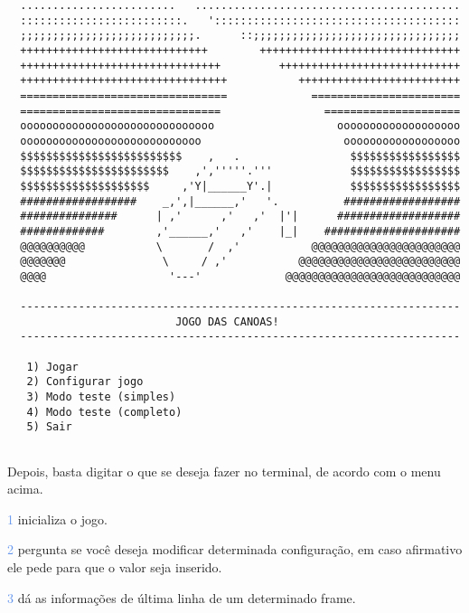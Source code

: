 \documentclass[a4paper,12pt]{article}
\begin{document}
  \begin{verbatim}
  ........................   .........................................
  :::::::::::::::::::::::::.   '::::::::::::::::::::::::::::::::::::::
  ;;;;;;;;;;;;;;;;;;;;;;;;;;;.      ::;;;;;;;;;;;;;;;;;;;;;;;;;;;;;;;;
  +++++++++++++++++++++++++++++        +++++++++++++++++++++++++++++++
  +++++++++++++++++++++++++++++++         ++++++++++++++++++++++++++++
  ++++++++++++++++++++++++++++++++           +++++++++++++++++++++++++
  ================================             =======================
  ===============================                =====================
  oooooooooooooooooooooooooooooo                   ooooooooooooooooooo
  oooooooooooooooooooooooooooo                      oooooooooooooooooo
  $$$$$$$$$$$$$$$$$$$$$$$$$    ,   .                 $$$$$$$$$$$$$$$$$
  $$$$$$$$$$$$$$$$$$$$$$$    ,','''''.'''            $$$$$$$$$$$$$$$$$
  $$$$$$$$$$$$$$$$$$$$     ,'Y|______Y'.|            $$$$$$$$$$$$$$$$$
  ##################    _,',|______,'   '.          ##################
  ###############      | ,'      ,'   ,'  |'|      ###################
  #############        ,'______,'   ,'    |_|    #####################
  @@@@@@@@@@           \       /  ,'           @@@@@@@@@@@@@@@@@@@@@@@
  @@@@@@@               \     / ,'           @@@@@@@@@@@@@@@@@@@@@@@@@
  @@@@                   '---'             @@@@@@@@@@@@@@@@@@@@@@@@@@@

  --------------------------------------------------------------------
                          JOGO DAS CANOAS!                            
  --------------------------------------------------------------------
                                                                      
   1) Jogar                                                           
   2) Configurar jogo                                                 
   3) Modo teste (simples)
   4) Modo teste (completo)
   5) Sair
  
  \end{verbatim}

  Depois, basta digitar o que se deseja fazer no terminal,
  de acordo com o menu acima.
  
  \textcolor{CornflowerBlue}{1} inicializa o jogo.
  
  \textcolor{CornflowerBlue}{2} pergunta se você deseja modificar determinada 
  configuração,
  em caso afirmativo ele pede para que o valor seja inserido.
  
  \textcolor{CornflowerBlue}{3} dá as informações de última linha de um 
  determinado frame.
  
\end{document}
